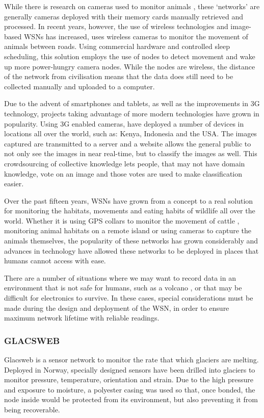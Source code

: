 	While there is research on cameras used to monitor animals \cite{Kays2009, Ahumada2011a}, these ‘networks’ are generally cameras deployed with their memory cards manually retrieved and processed. In recent years, however, the use of wireless technologies and image-based WSNs has increased, \cite{Garcia-Sanchez2010b} uses wireless cameras to monitor the movement of animals between roads. Using commercial hardware and controlled sleep scheduling, this solution employs the use of nodes to detect movement and wake up more power-hungry camera nodes. While the nodes are wireless, the distance of the network from civilisation means that the data does still need to be collected manually and uploaded to a computer.

	Due to the advent of smartphones and tablets, as well as the improvements in 3G technology, projects taking advantage of more modern technologies have grown in popularity. Using 3G enabled cameras, \cite{ZSL} have deployed a number of devices in locations all over the world, such as: Kenya, Indonesia and the USA. The images captured are transmitted to a server and a website allows the general public to not only see the images in near real-time, but to classify the images as well. This crowdsourcing of collective knowledge lets people, that may not have domain knowledge, vote on an image and those votes are used to make classification easier.

	Over the past fifteen years, WSNs have grown from a concept to a real solution for monitoring the habitats, movements and eating habits of wildlife all over the world. Whether it is using GPS collars to monitor the movement of cattle \cite{Guo2006}, monitoring animal habitats on a remote island or using cameras to capture the animals themselves, the popularity of these networks has grown considerably and advances in technology have allowed these networks to be deployed in places that humans cannot access with ease.
	
		There are a number of situations where we may want to record data in an environment that is not safe for humans, such as a volcano \cite{Werner-Allen2006}, or that may be difficult for electronics to survive. In these cases, special considerations must be made during the design and deployment of the WSN, in order to ensure maximum  network lifetime with reliable readings.
	\subsubsection{GLACSWEB}
	Glacsweb is a sensor network to monitor the rate that which glaciers are melting. Deployed in Norway, specially designed sensors have been drilled into glaciers to monitor pressure, temperature, orientation and strain. Due to the high pressure and exposure to moisture, a polyester casing was used so that, once bonded, the node inside would be protected from its environment, but also preventing it from being recoverable.
